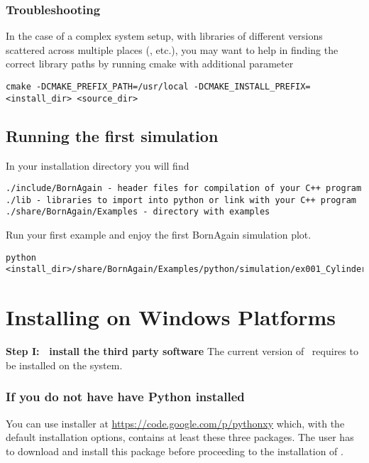 \subsubsection{Troubleshooting}

In the case of a complex system setup, with libraries of different versions 
scattered across multiple places (,  etc.),
you may want to help  in finding the correct library paths
by running cmake with additional parameter 
\begin{lstlisting}[language=shell, style=commandline]
cmake -DCMAKE_PREFIX_PATH=/usr/local -DCMAKE_INSTALL_PREFIX=<install_dir> <source_dir>
\end{lstlisting}



\subsection{Running the first simulation}

In your installation directory you will find
\begin{lstlisting}[language=shell, style=commandline, keywordstyle=\color{black}]
./include/BornAgain - header files for compilation of your C++ program
./lib - libraries to import into python or link with your C++ program
./share/BornAgain/Examples - directory with examples
\end{lstlisting}

Run your first example and enjoy the first BornAgain simulation plot.
\begin{lstlisting}[language=shell, style=commandline]
python <install_dir>/share/BornAgain/Examples/python/simulation/ex001_CylindersAndPrisms/CylindersAndPrisms.py
\end{lstlisting}




\section{Installing on Windows Platforms} 


\noindent
{\bf Step I: $~$ install the third party software} \newline
The current version of \BornAgain\ requires  
to be installed on the system. 

\subsubsection{If you do not have have Python installed}
You can use  installer
at \url{https://code.google.com/p/pythonxy} which, with the default installation options, contains at least these three packages.
The user has to download and install this package before proceeding to
the installation of \BornAgain.
\vspace*{2mm}


